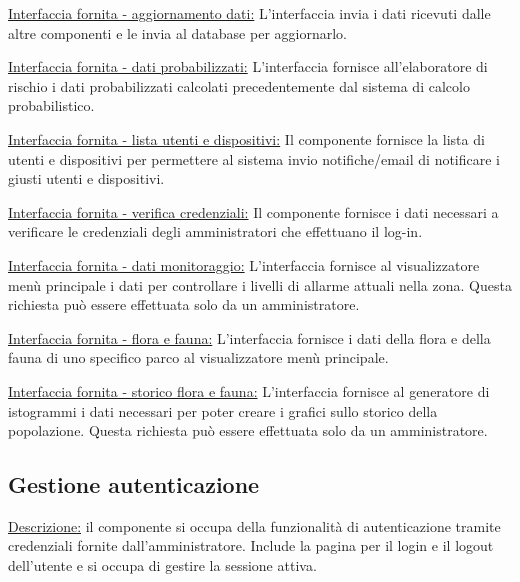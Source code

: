 \vspace{5mm}
\noindent
\underline{Interfaccia fornita - aggiornamento dati:}
L'interfaccia invia i dati ricevuti dalle altre componenti e le invia al database per aggiornarlo.

\vspace{5mm}
\noindent
\underline{Interfaccia fornita - dati probabilizzati:}
L'interfaccia fornisce all'elaboratore di rischio i dati probabilizzati calcolati precedentemente dal sistema di calcolo probabilistico.

\vspace{5mm}
\noindent
\underline{Interfaccia fornita - lista utenti e dispositivi:}
Il componente fornisce la lista di utenti e dispositivi per permettere al sistema invio notifiche/email di notificare i giusti utenti e dispositivi.

\vspace{5mm}
\noindent
\underline{Interfaccia fornita - verifica credenziali:}
Il componente fornisce i dati necessari a verificare le credenziali degli amministratori che effettuano il log-in.

\vspace{5mm}
\noindent
\underline{Interfaccia fornita - dati monitoraggio:}
L'interfaccia fornisce al visualizzatore menù principale i dati per controllare i livelli di allarme attuali nella zona. Questa richiesta può essere effettuata solo da un amministratore.

\vspace{5mm}
\noindent
\underline{Interfaccia fornita - flora e fauna:}
L'interfaccia fornisce i dati della flora e della fauna di uno specifico parco al visualizzatore menù principale.

\vspace{5mm}
\noindent
\underline{Interfaccia fornita - storico flora e fauna:}
L'interfaccia fornisce al generatore di istogrammi i dati necessari per poter creare i grafici sullo storico della popolazione. Questa richiesta può essere effettuata solo da un amministratore.

\subsection*{Gestione autenticazione}
\underline{Descrizione:} il componente si occupa della funzionalità di autenticazione tramite credenziali fornite dall'amministratore. Include la pagina per il login e il logout dell'utente e si occupa di gestire la sessione attiva.

